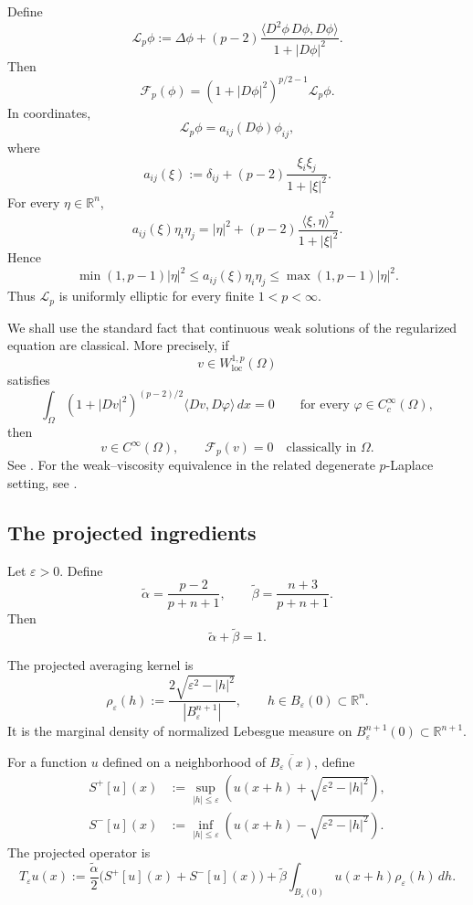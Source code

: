 \documentclass[12pt,reqno]{amsart}
\numberwithin{equation}{section}
\theoremstyle{plain}
\theoremstyle{definition}
\theoremstyle{remark}
\newcommand{\R}{\mathbb{R}}
\newcommand{\talpha}{\widetilde\alpha}
\newcommand{\tbeta}{\widetilde\beta}
\newcommand{\Sp}{S^+}
\newcommand{\Sm}{S^-}
\newcommand{\rhoeps}{\rho_\varepsilon}
\newcommand{\Reg}{\mathcal{F}}
\newcommand{\Lp}{\mathcal L_p}
\begin{document}
Define
\begin{equation}\label{eq:L-operator}
  \Lp\phi
  :=
  \Delta\phi
  +(p-2)
  \frac{\langle D^2\phi\,D\phi,D\phi\rangle}{1+|D\phi|^2}.
\end{equation}
Then
\[
  \Reg_p(\phi)
  =
  (1+|D\phi|^2)^{p/2-1}\Lp\phi .
\]
In coordinates,
\[
  \Lp\phi
  =
  a_{ij}(D\phi)\phi_{ij},
\]
where
\[
  a_{ij}(\xi)
  :=
  \delta_{ij}
  +(p-2)\frac{\xi_i\xi_j}{1+|\xi|^2}.
\]
For every $\eta\in\R^n$,
\[
  a_{ij}(\xi)\eta_i\eta_j
  =
  |\eta|^2
  +
  (p-2)\frac{\langle \xi,\eta\rangle^2}{1+|\xi|^2}.
\]
Hence
\[
  \min(1,p-1)|\eta|^2
  \le
  a_{ij}(\xi)\eta_i\eta_j
  \le
  \max(1,p-1)|\eta|^2.
\]
Thus $\Lp$ is uniformly elliptic for every finite $1<p<\infty$.

We shall use the standard fact that continuous weak solutions of the
regularized equation are classical. More precisely, if
\[
  v\in W^{1,p}_{\mathrm{loc}}(\Omega)
\]
satisfies
\begin{equation}\label{eq:weak-form}
  \int_\Omega
  (1+|Dv|^2)^{(p-2)/2}
  \langle Dv,D\varphi\rangle\,dx
  =
  0
  \qquad
  \text{for every }\varphi\in C_c^\infty(\Omega),
\end{equation}
then
\[
  v\in C^\infty(\Omega),
  \qquad
  \Reg_p(v)=0
  \quad\text{classically in }\Omega .
\]
See \cite{Lieberman88,GilbargTrudinger}. For the weak--viscosity
equivalence in the related degenerate $p$-Laplace setting, see
\cite{JLM01}.

\subsection{The projected ingredients}
\label{subsec:scheme}

Let $\varepsilon>0$. Define
\begin{equation}\label{eq:weights}
  \talpha=\frac{p-2}{p+n+1},
  \qquad
  \tbeta=\frac{n+3}{p+n+1}.
\end{equation}
Then
\[
  \talpha+\tbeta=1.
\]

The projected averaging kernel is
\begin{equation}\label{eq:rho}
  \rhoeps(h)
  :=
  \frac{2\sqrt{\varepsilon^2-|h|^2}}{|B_\varepsilon^{n+1}|},
  \qquad
  h\in B_\varepsilon(0)\subset\R^n.
\end{equation}
It is the marginal density of normalized Lebesgue measure on
$B_\varepsilon^{n+1}(0)\subset\R^{n+1}$.

For a function $u$ defined on a neighborhood of
$\overline{B_\varepsilon(x)}$, define
\begin{align}
  \Sp[u](x)
  &:=
  \sup_{|h|\le\varepsilon}
  \left(
    u(x+h)+\sqrt{\varepsilon^2-|h|^2}
  \right),
  \label{eq:Splus}\\
  \Sm[u](x)
  &:=
  \inf_{|h|\le\varepsilon}
  \left(
    u(x+h)-\sqrt{\varepsilon^2-|h|^2}
  \right).
  \label{eq:Sminus}
\end{align}
The projected operator is
\begin{equation}\label{eq:proj-DPP}
  T_\varepsilon u(x)
  :=
  \frac{\talpha}{2}
  \bigl(\Sp[u](x)+\Sm[u](x)\bigr)
  +
  \tbeta
  \int_{B_\varepsilon(0)}
  u(x+h)\rhoeps(h)\,dh.
\end{equation}
\end{document}
